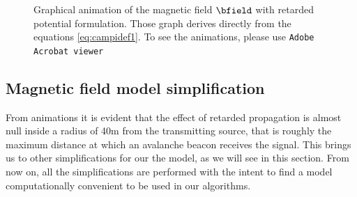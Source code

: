 \begin{figure}[p]
\label{fig:animazionifield}
 \newline
{}
 \newline
{} 
\caption{Graphical animation of the magnetic field $\bfield$ with retarded potential formulation. Those graph derives directly from the equations \ref{eq:campidef1}. To see the animations, please use \texttt{Adobe Acrobat viewer}}
\end{figure}

\subsection{Magnetic field model simplification}
From animations it is evident that the effect of retarded propagation is almost null inside a radius of \num{40}\si{\meter} from the transmitting source, that is roughly the maximum distance at which an avalanche beacon receives the signal. This brings us to other simplifications for our the model, as we will see in this section. From now on, all the simplifications are performed with the intent to find a model computationally convenient to be used in our algorithms.

